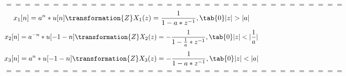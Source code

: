 \begin{Formelsamling}
    \begin{underrubrik}
        \[====================================                                                                                          \]
        \[x_1[n] = a^n*u[n] \transformation{Z} X_1(z) = \frac{1}{1 - a*z^{-1}}, \tab{0} |z| > |a|                                          \]
        \[x_2[n] = a^{-n}*u[-1-n] \transformation{Z} X_2(z) = -\frac{1}{1 - \frac{1}{a}*z^{-1}}, \tab{0} |z| < |\frac{1}{a}|               \]
        \[x_3[n] = a^n*u[-1-n] \transformation{Z} X_3(z) = - \frac{1}{1 - a*z^{-1}}, \tab{0} |z|<|a|                                       \]
        \[====================================                                                                                          \]
    \end{underrubrik}
    \begin{underrubrik}
    \end{underrubrik}
\end{Formelsamling}
